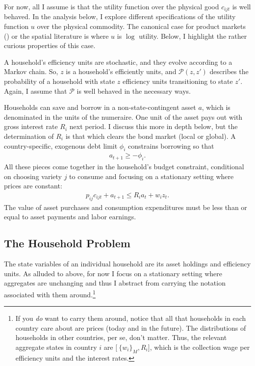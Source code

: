 \documentclass[12pt,pdftex]{article}
\begin{document}
\begin{onehalfspacing}
For now, all I assume is that the utility function over the physical good $c_{ijt}$ is well behaved. In the analysis below, I explore different specifications of the utility function $u$ over the physical commodity. The canonical case for product markets (\citet{anderson1987ces}) or the spatial literature is where $u$ is $\log$ utility. Below, I highlight the rather curious properties of this case.

A household's efficiency units are stochastic, and they evolve according to a Markov chain. So, $z$ is a household's efficiently units, and $\mathcal{P}(z,z')$ describes the probability of a household with state $z$ efficiency units transitioning to state $z'$. Again, I assume that $\mathcal{P}$ is well behaved in the necessary ways.

Households can save and borrow in a non-state-contingent asset $a$, which is denominated in the units of the numeraire. One unit of the asset pays out with gross interest rate $R_i$ next period. I discuss this more in depth below, but the determination of $R_{i}$ is that which clears the bond market (local or global). A country-specific, exogenous debt limit $\phi_{i}$ constrains borrowing so that
\begin{align}
a_{t+1} \geq - \phi_{i}.
\label{eq:borrowing-constraint}
\end{align}
All these pieces come together in the household's budget constraint, conditional on choosing variety $j$ to consume and focusing on a stationary setting where prices are constant:
\begin{align}
p_{ij}c_{ijt} +  a_{t+1} \leq    R_{i} a_{t} + w_{i} z_{t}.\label{eq:trade-budget-constraint}
\end{align}
The value of asset purchases and consumption expenditures must be less than or equal to asset payments and labor earnings.

\subsection{The Household Problem}

The state variables of an individual household are its asset holdings and efficiency units. As alluded to above, for now I focus on a stationary setting where aggregates are unchanging and thus I abstract from carrying the notation associated with them around.\footnote{If you \emph{do} want to carry them around, notice that all that households in each country care about are prices (today and in the future). The distributions of households in other countries, per se, don't matter. Thus, the relevant aggregate states in country $i$ are $\big [ \ \{ w_i \}_{M}, R_i \big ]$, which is the collection wage per efficiency units and the interest rates.}


\end{onehalfspacing}
\end{document}
